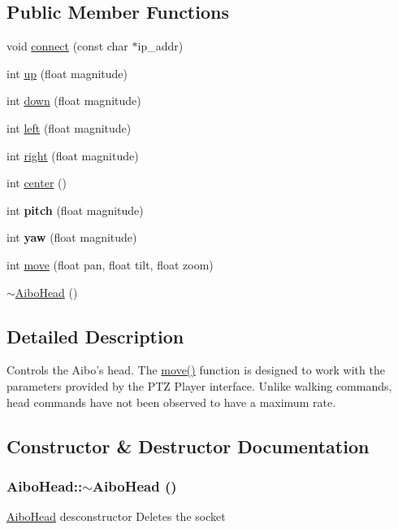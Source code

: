 \subsection*{Public Member Functions}
\begin{DoxyCompactItemize}
\item 
void \hyperlink{classAiboHead_a5fef344c99e421b7c704099628ca3542}{connect} (const char $\ast$ip\_\-addr)
\item 
int \hyperlink{classAiboHead_a085f54c6374d5eb117c12b0e9cad2d0e}{up} (float magnitude)
\item 
int \hyperlink{classAiboHead_a60bd059ca7a58ee2b3ee95011150ea89}{down} (float magnitude)
\item 
int \hyperlink{classAiboHead_a4821a0ccff77b881636aec49703a3683}{left} (float magnitude)
\item 
int \hyperlink{classAiboHead_a6be7b6743be53896c2f41dc1db1ce2a5}{right} (float magnitude)
\item 
int \hyperlink{classAiboHead_a2e754379dcba417ebd438c40b437db76}{center} ()
\item 
\hypertarget{classAiboHead_a8a1c455d24761b2946b796150ff2fd67}{
int {\bfseries pitch} (float magnitude)}
\label{classAiboHead_a8a1c455d24761b2946b796150ff2fd67}

\item 
\hypertarget{classAiboHead_aa22c906d22cb79780d47b7ac3730dee4}{
int {\bfseries yaw} (float magnitude)}
\label{classAiboHead_aa22c906d22cb79780d47b7ac3730dee4}

\item 
int \hyperlink{classAiboHead_adf0f91fafeaa5e32b5e387ac136e0f37}{move} (float pan, float tilt, float zoom)
\item 
\hyperlink{classAiboHead_ac1c26e972e0afced5e89affd987344e6}{$\sim$AiboHead} ()
\end{DoxyCompactItemize}


\subsection{Detailed Description}
Controls the Aibo's head. The \hyperlink{classAiboHead_adf0f91fafeaa5e32b5e387ac136e0f37}{move()} function is designed to work with the parameters provided by the PTZ Player interface. Unlike walking commands, head commands have not been observed to have a maximum rate. 

\subsection{Constructor \& Destructor Documentation}
\hypertarget{classAiboHead_ac1c26e972e0afced5e89affd987344e6}{
\subsubsection[{$\sim$AiboHead}]{\setlength{\rightskip}{0pt plus 5cm}AiboHead::$\sim$AiboHead ()}}
\label{classAiboHead_ac1c26e972e0afced5e89affd987344e6}
\hyperlink{classAiboHead}{AiboHead} desconstructor Deletes the socket 

